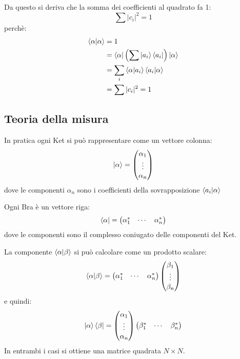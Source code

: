\documentclass[a4paper]{article}
\begin{document}
\vspace{1em}
\noindent
Da questo si deriva che la somma dei coefficienti al quadrato fa 1:
\[
  \sum |c_i|^2 = 1
\] 
perchè:
\[
  \begin{aligned}
    \braket{\alpha}{\alpha} &= 1\\
                            &=\bra{\alpha} \left( \sum \ket{a_i} \bra{a_i} \right) \ket{\alpha}\\
                            &= \sum_i \braket{\alpha}{a_i} \braket{a_i}{\alpha}\\
                            &= \sum |c_i|^2 = 1
  \end{aligned}
\] 

\subsection{Teoria della misura}
In pratica ogni Ket si può rappresentare come un vettore colonna:
\[
  \ket{\alpha} =
  \begin{pmatrix} 
    \alpha_1\\
    \vdots\\
    \alpha_n
  \end{pmatrix} 
\] 
dove le componenti \( \alpha_n \) sono i coefficienti della sovrapposizione \( \braket{a_i}{\alpha} \) 

\vspace{1em}
\noindent
Ogni Bra è un vettore riga:
\[
  \bra{\alpha} = \begin{pmatrix} \alpha_1^* & \cdots & \alpha_n^* \end{pmatrix}
\] 
dove le componenti sono il complesso coniugato delle componenti del Ket.

\vspace{1em}
\noindent
La componente \( \braket{\alpha}{\beta} \) si può calcolare come un prodotto scalare:
\[
  \braket{\alpha}{\beta} = 
  \begin{pmatrix} \alpha_1^* & \cdots & \alpha_n^* \end{pmatrix}
  \begin{pmatrix} 
    \beta_1\\
    \vdots\\
    \beta_n
  \end{pmatrix}
\] 
e quindi:
\[
  \ket{\alpha} \bra{\beta} =
  \begin{pmatrix} 
    \alpha_1\\
    \vdots\\
    \alpha_n
  \end{pmatrix}
  \begin{pmatrix} \beta_1^* & \cdots & \beta_n^* \end{pmatrix}
\] 
In entrambi i casi si ottiene una matrice quadrata \( N \times N \).
\end{document}
